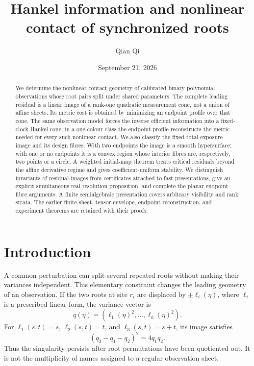 \documentclass[11pt,reqno]{amsart}
\title[Hankel information and nonlinear root contact]{Hankel information and nonlinear contact of synchronized roots}
\author{Qian Qi}
\date{September 21, 2026}
\numberwithin{equation}{section}
\theoremstyle{definition}
\theoremstyle{remark}
\begin{document}
\begin{abstract}
We determine the nonlinear contact geometry of calibrated binary polynomial observations whose root pairs split under shared parameters. The complete leading residual is a linear image of a rank-one quadratic measurement cone, not a union of affine sheets. Its metric cost is obtained by minimizing an endpoint profile over that cone. The same observation model forces the inverse efficient information into a fixed-clock Hankel cone; in a one-colour class the endpoint profile reconstructs the metric needed for every such nonlinear contact. We also classify the fixed-total-exposure image and its design fibres. With two endpoints the image is a smooth hypersurface; with one or no endpoints it is a convex region whose interior fibres are, respectively, two points or a circle. A weighted initial-map theorem treats critical residuals beyond the affine derivative regime and gives coefficient-uniform stability. We distinguish invariants of residual images from certificates attached to fast presentations, give an explicit simultaneous real resolution proposition, and complete the planar endpoint-fibre arguments. A finite semialgebraic presentation covers arbitrary visibility and rank strata. The earlier finite-sheet, tensor-envelope, endpoint-reconstruction, and experiment theorems are retained with their proofs.
\end{abstract}
\maketitle

\section{Introduction}
A common perturbation can split several repeated roots without making their variances independent. This elementary constraint changes the leading geometry of an observation. If the two roots at site $r_i$ are displaced by $\pm\ell_i(\eta)$, where $\ell_i$ is a prescribed linear form, the variance vector is
\[
 q(\eta)=(\ell_1(\eta)^2,\ldots,\ell_k(\eta)^2).
\]
For $\ell_1(s,t)=s$, $\ell_2(s,t)=t$, and $\ell_3(s,t)=s+t$, its image satisfies
\[
 (q_3-q_1-q_2)^2=4q_1q_2.
\]
Thus the singularity persists after root permutations have been quotiented out. It is not the multiplicity of names assigned to a regular observation sheet.
\end{document}
